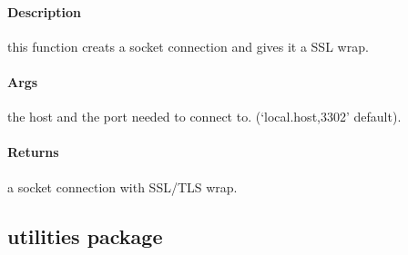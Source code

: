 \documentclass[letterpaper,10pt,english]{sphinxmanual}
\begin{document}
\begin{fulllineitems}
\label{\detokenize{connection:connection.socket_connection.connect_to_ssl_socket}}
\pysigstartsignatures
{}
\pysigstopsignatures

\paragraph{Description}
\label{\detokenize{connection:description}}
\sphinxAtStartPar
this function creats a socket connection and gives it a SSL wrap.


\paragraph{Args}
\label{\detokenize{connection:args}}\begin{description}
\sphinxAtStartPar
the host and the port needed to connect to.
(‘local.host,3302’ default).

\end{description}


\paragraph{Returns}
\label{\detokenize{connection:returns}}\begin{description}
\sphinxAtStartPar
a socket connection with SSL/TLS wrap.

\end{description}

\end{fulllineitems}

\label{\detokenize{connection:connections}}
\sphinxstepscope


\subsection{utilities package}
\label{\detokenize{utilities:utilities-package}}\label{\detokenize{utilities::doc}}
\end{document}
